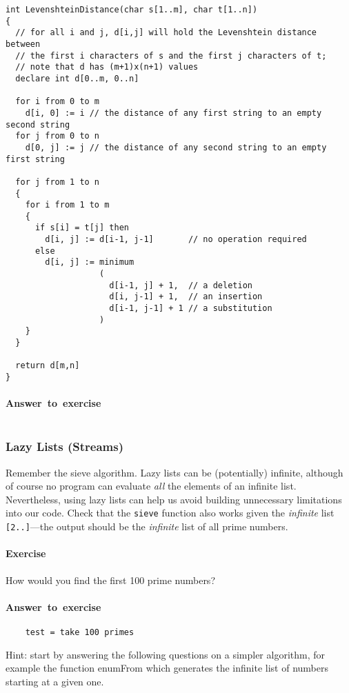 \documentclass{article}
\newcommand{\percents}[1]{\protect \marginpar[l]{\bf [#1]}}
\newcounter{question}
\newcommand{\question}[1]{
  \addtocounter{question}{1}
  \paragraph{Exercise~\arabic{question}  \percents{#1}}
 }
\newenvironment{ex}[1]{\question{#1}}{\vspace{1em}}
\newenvironment{ans}{\begin{framed}\paragraph{Answer~to~exercise~\arabic{question}}}{\end{framed}}
\newcommand{\correctedLastYear}[1]{}
\begin{document}
\begin{verbatim}
int LevenshteinDistance(char s[1..m], char t[1..n])
{
  // for all i and j, d[i,j] will hold the Levenshtein distance between
  // the first i characters of s and the first j characters of t;
  // note that d has (m+1)x(n+1) values
  declare int d[0..m, 0..n]

  for i from 0 to m
    d[i, 0] := i // the distance of any first string to an empty second string
  for j from 0 to n
    d[0, j] := j // the distance of any second string to an empty first string

  for j from 1 to n
  {
    for i from 1 to m
    {
      if s[i] = t[j] then
        d[i, j] := d[i-1, j-1]       // no operation required
      else
        d[i, j] := minimum
                   (
                     d[i-1, j] + 1,  // a deletion
                     d[i, j-1] + 1,  // an insertion
                     d[i-1, j-1] + 1 // a substitution
                   )
    }
  }

  return d[m,n]
}
\end{verbatim}

\begin{ans}
\inputminted{haskell}{Diff.hs}
\end{ans}

\subsubsection{Lazy Lists (Streams)}

Remember the sieve algorithm. Lazy lists can be (potentially)
infinite, although of course no program can evaluate {\em all} the
elements of an infinite list. Nevertheless, using lazy lists can help
us avoid building unnecessary limitations into our code.  Check that
the \verb!sieve! function also works given the {\em infinite} list
\verb![2..]!---the output should be the {\em infinite} list of all
prime numbers.

\begin{ex}{*\correctedLastYear5,@5}
How would you find the first 100 prime numbers?
\begin{ans}
  \begin{verbatim}
    test = take 100 primes
  \end{verbatim}
\end{ans}
\end{ex}

Hint: start by answering the following questions on a simpler
algorithm, for example the function \textsf{enumFrom} which generates
the infinite list of numbers starting at a given one.
\end{document}
